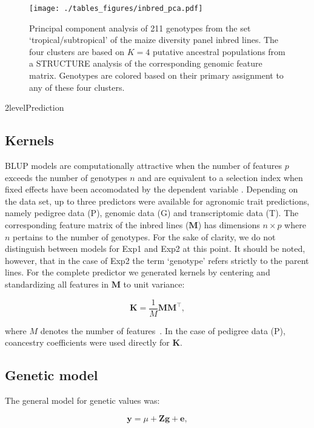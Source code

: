 \documentclass[12pt,titlepage]{article}
\begin{document}
\begin{figure}[H]
  \centering
  \texttt{[image: ./tables\_figures/inbred\_pca.pdf]}
  \caption{
  Principal component analysis of 211 genotypes from the set
  `tropical/subtropical' of the maize diversity panel inbred lines.
  The four clusters are based on $K=4$ putative ancestral populations from a
  STRUCTURE analysis of the corresponding genomic feature matrix.
  Genotypes are colored based on their primary assignment to any of these four
  clusters.
}
\label{fig:inbred-pca}
\end{figure}



\Genetics2level{Prediction}
\subsection{Kernels}
BLUP models are computationally attractive when the number of features $p$
exceeds the number of genotypes $n$ and are equivalent to a selection index
when fixed effects have been accomodated by the dependent variable 
\cite{Mrode2014}.
Depending on the data set, up to three predictors were available for agronomic
trait predictions, namely pedigree data (P), genomic data (G) and
transcriptomic data (T).
The corresponding feature matrix of the inbred lines ($\mathbf{M}$) has
dimensions $n \times p$ where $n$ pertains to the number of genotypes.
For the sake of clarity, we do not distinguish between models for Exp1 and Exp2
at this point.
It should be noted, however, that in the case of Exp2 the term `genotype' refers
strictly to the parent lines.
For the complete predictor we generated kernels by centering and standardizing
all features in $\mathbf{M}$ to unit variance:

\begin{equation} \label{eq:GenomicRelationship}
  \mathbf{K} = \frac{1}{M} \mathbf{M} \mathbf{M}^{\top},
\end{equation}

where $M$ denotes the number of features~\cite{VanRaden2008}.
In the case of pedigree data (P), coancestry coefficients were used directly
for $\mathbf{K}$.


\subsection{Genetic model}
The general model for genetic values was:

\begin{equation} \label{eq:KBLUPModel}
  \mathbf{y} = \mu + \mathbf{Z} \mathbf{g} + \mathbf{e},
\end{equation}
\end{document}
